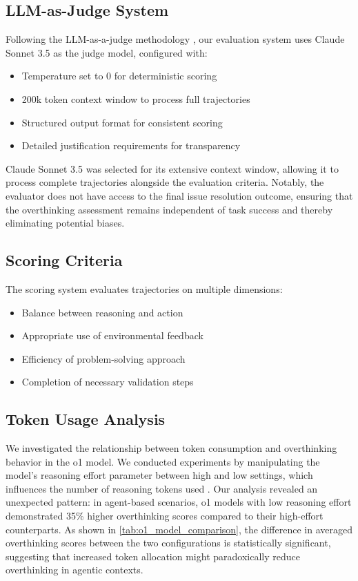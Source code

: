 \subsection{LLM-as-Judge System}
Following the LLM-as-a-judge methodology \cite{zheng2023judgingllmasajudgemtbenchchatbot}, our evaluation system uses Claude Sonnet 3.5 as the judge model, configured with:
\begin{itemize}
    \item Temperature set to 0 for deterministic scoring
    \item 200k token context window to process full trajectories
    \item Structured output format for consistent scoring
    \item Detailed justification requirements for transparency
\end{itemize}

Claude Sonnet 3.5 was selected for its extensive context window, allowing it to process complete trajectories alongside the evaluation criteria. Notably, the evaluator does not have access to the final issue resolution outcome, ensuring that the overthinking assessment remains independent of task success and thereby eliminating potential biases.

\subsection{Scoring Criteria}
The scoring system evaluates trajectories on multiple dimensions:
\begin{itemize}
    \item Balance between reasoning and action
    \item Appropriate use of environmental feedback
    \item Efficiency of problem-solving approach
    \item Completion of necessary validation steps
\end{itemize}

\subsection{Token Usage Analysis}
We investigated the relationship between token consumption and overthinking behavior in the o1 model. We conducted experiments by manipulating the model's reasoning effort parameter between high and low settings, which influences the number of reasoning tokens used \cite{openai_chat_api}. Our analysis revealed an unexpected pattern: in agent-based scenarios, o1 models with low reasoning effort demonstrated 35\% higher overthinking scores compared to their high-effort counterparts. As shown in \cref{tab:o1_model_comparison}, the difference in averaged overthinking scores between the two configurations is statistically significant, suggesting that increased token allocation might paradoxically reduce overthinking in agentic contexts.


